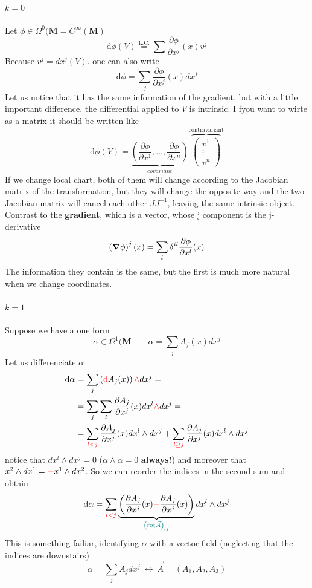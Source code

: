 \documentclass[../main.tex]{subfiles}
\begin{document}
\paragraph{$\boxed{k=0}$}Let $\phi\in \Omega^0(\mathbf{M}=C^\infty(\mathbf{M})$
\[
\textrm{d}\phi(V) \overset{\textrm{L.C.}}{=}\sum\frac{\partial\phi}{\partial x^j}(x)v^j
\]
Because $v^j=dx^j(V)$. one can also write
\[
\textrm{d}\phi=\sum_j\frac{\partial\phi}{\partial x^j}(x)dx^j
\]
Let us notice that it has the same information of the gradient, but with a little important difference. the differential applied to $V$ is intrinsic. I fyou want to wirte as a matrix it should be written like
\[
\textrm{d}\phi(V)=\underbrace{\left(\frac{\partial \phi}{\partial x^1}, \dots, \frac{\partial \phi}{\partial x^n}\right)}_{covariant}
\overbrace{
\begin{pmatrix}
v^1\\
\vdots\\
v^n
\end{pmatrix}
}^{\textrm{contravariant}}
\]
If we change local chart, both of them will change according to the Jacobian matrix of the transformation, but they will change the opposite way and the two Jacobian matrix will cancel each other $JJ^{-1}$, leaving the same intrinsic object. Contrast to the \textbf{gradient}, which is a vector, whose j component is the j-derivative 
\[
\left(\grad \phi\right)^j(x)=\sum_l\delta^{il}\frac{\partial\phi}{\partial x^l}(x)
\]
The information they contain is the same, but the first is much more natural when we change coordinates.
\paragraph{$\boxed{k=1}$} Suppose we have a one form
\[
\alpha \in \Omega^1(\mathbf{M} \qquad \alpha = \sum_j A_j(x)dx^j
\]
Let us differenciate $\alpha$
\[
\begin{split}
\textrm{d}\alpha
&=\sum_j\left({\color{red} \textrm{d}}A_j(x)\right){\color{red}\wedge}dx^j=\\
&=\sum_j\sum_l\frac{\partial A_j}{\partial x^j}(x)dx^l{\color{red}\wedge}dx^j=\\
&=\sum_{\color{red}l<j}\frac{\partial A_j}{\partial x^j}(x)dx^l\wedge dx^j+\sum_{\color{red}l\geq j}\frac{\partial A_j}{\partial x^j}(x)dx^l\wedge dx^j
\end{split}
\]
notice that $dx^l\wedge dx^j=0$ ($\alpha \wedge\alpha=0$ \textbf{always!}) and moreover that $x^2\wedge dx^1={\color{red}-}x^1\wedge dx^2$. So we can reorder the indices in the second sum and obtain
\[
\textrm{d}\alpha=\sum_{\color{red}l<j}\underbrace{\left(\frac{\partial A_j}{\partial x^j}(x){\color{red}-}\frac{\partial A_j}{\partial x^j}(x)\right)}_{\color{teal} \left(\textrm{rot}\Vec{A}\right)_{lj}}dx^l\wedge dx^j
\]
This is something failiar, identifying $\alpha$ with a vector field (neglecting that the indices are downstairs)
\[
\alpha = \sum_j A_jdx^j \ \longleftrightarrow \ \Vec{A}=\left(A_1,A_2,A_3\right)
\]
\end{document}
